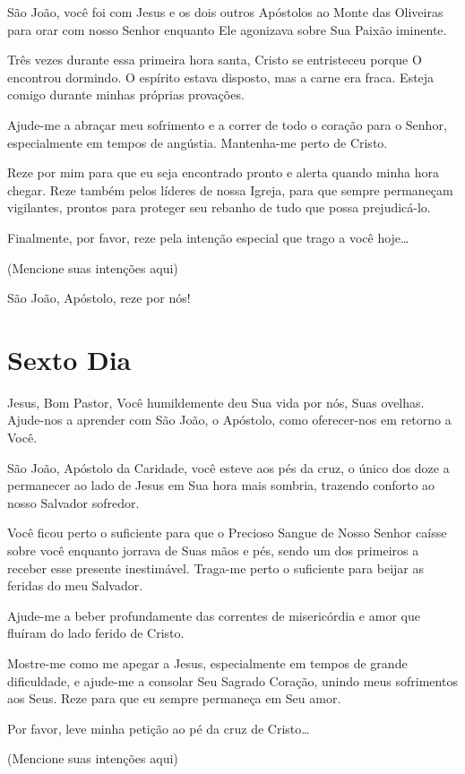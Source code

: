 \documentclass[11pt]{article}
\begin{document}
São João, você foi com Jesus e os dois outros Apóstolos ao Monte das Oliveiras para orar com nosso Senhor enquanto Ele agonizava sobre Sua Paixão iminente.

Três vezes durante essa primeira hora santa, Cristo se entristeceu porque O encontrou dormindo. O espírito estava disposto, mas a carne era fraca. Esteja comigo durante minhas próprias provações.

Ajude-me a abraçar meu sofrimento e a correr de todo o coração para o Senhor, especialmente em tempos de angústia. Mantenha-me perto de Cristo.

Reze por mim para que eu seja encontrado pronto e alerta quando minha hora chegar. Reze também pelos líderes de nossa Igreja, para que sempre permaneçam vigilantes, prontos para proteger seu rebanho de tudo que possa prejudicá-lo.

Finalmente, por favor, reze pela intenção especial que trago a você hoje…

(Mencione suas intenções aqui)

São João, Apóstolo, reze por nós!


\section{Sexto Dia}

Jesus, Bom Pastor, Você humildemente deu Sua vida por nós, Suas ovelhas. Ajude-nos a aprender com São João, o Apóstolo, como oferecer-nos em retorno a Você.

São João, Apóstolo da Caridade, você esteve aos pés da cruz, o único dos doze a permanecer ao lado de Jesus em Sua hora mais sombria, trazendo conforto ao nosso Salvador sofredor.

Você ficou perto o suficiente para que o Precioso Sangue de Nosso Senhor caísse sobre você enquanto jorrava de Suas mãos e pés, sendo um dos primeiros a receber esse presente inestimável. Traga-me perto o suficiente para beijar as feridas do meu Salvador.

Ajude-me a beber profundamente das correntes de misericórdia e amor que fluíram do lado ferido de Cristo.

Mostre-me como me apegar a Jesus, especialmente em tempos de grande dificuldade, e ajude-me a consolar Seu Sagrado Coração, unindo meus sofrimentos aos Seus. Reze para que eu sempre permaneça em Seu amor.

Por favor, leve minha petição ao pé da cruz de Cristo…

(Mencione suas intenções aqui)
\end{document}

